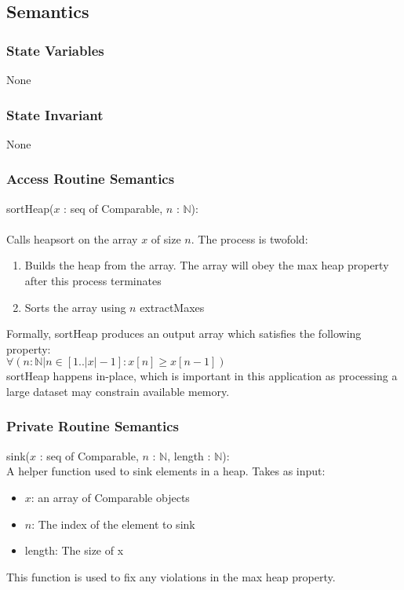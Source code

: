 \documentclass[12pt]{article}
\begin{document}
\subsection* {Semantics}

\subsubsection* {State Variables}

None
\subsubsection* {State Invariant}

None

\subsubsection* {Access Routine Semantics}

sortHeap($x$ : seq of Comparable, $n$ : $\mathbb{N}$):\\\\
Calls heapsort on the array $x$ of size $n$. The process is twofold:
\begin{enumerate}
\item Builds the heap from the array. The array will obey the max heap property
      after this process terminates
\item Sorts the array using $n$ extractMaxes
\end{enumerate}

\noindent
Formally, sortHeap produces an output array which satisfies the following property:\\

$\forall (n : \mathbb{N} | n \in [1..|x|-1] : x[n] \geq x[n-1])$\\

\noindent
sortHeap happens in-place, which is important in this application as processing a large
dataset may constrain available memory.

\subsubsection* {Private Routine Semantics}

sink($x$ : seq of Comparable, $n$ : $\mathbb{N}$, length : $\mathbb{N}$):\\
A helper function used to sink elements in a heap. Takes as input:
\begin{itemize}
\item $x$: an array of Comparable objects
\item $n$: The index of the element to sink
\item length: The size of x
\end{itemize}
This function is used to fix any violations in the max heap property.\\
\end{document}
